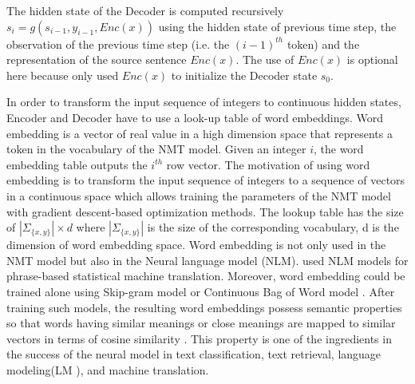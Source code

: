 The hidden state of the Decoder is computed recursively $s_i = g(s_{i-1},y_{i-1},Enc(x))$ using the hidden state of previous time step, the observation of the previous time step (i.e. the $(i-1)^{th}$ token) and the representation of the source sentence $Enc(x)$. The use of $Enc(x)$ is optional here because \cite{Sutskever14sequence} only used $Enc(x)$ to initialize the Decoder state $s_0$.

In order to transform the input sequence of integers to continuous hidden states, Encoder and Decoder have to use a look-up table of word embeddings. Word embedding is a vector of real value in a high dimension space that represents a token in the vocabulary of the NMT model. Given an integer $i$, the word embedding table outputs the $i^{th}$ row vector. The motivation of using word embedding is to transform the input sequence of integers to a sequence of vectors in a continuous space which allows training the parameters of the NMT model with gradient descent-based optimization methods. The lookup table has the size of $|\Sigma_{\{x,y\}}| \times d$ where $|\Sigma_{\{x,y\}}|$ is the size of the corresponding vocabulary, d is the dimension of word embedding space. Word embedding is not only used in the NMT model but also in the Neural language model \cite{Bengio03aneural}(NLM). \cite{Le12continuous, Schwenk12continuous} used NLM models for phrase-based statistical machine translation. Moreover, word embedding could be trained alone using Skip-gram model \citep{Mikolov13distributed} or Continuous Bag of Word model \cite{Mikolov13efficient}. After training such models, the resulting word embeddings possess semantic properties so that words having similar meanings or close meanings are mapped to similar vectors in terms of cosine similarity \citep{Collobert11natural, Mikolov13distributed, collobert08aunified}. This property is one of the ingredients in the success of the neural model in text classification, text retrieval, language modeling(LM ), and machine translation.
 
